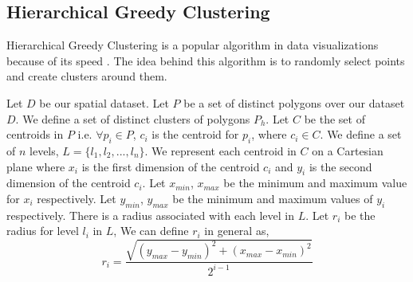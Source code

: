


\subsection{Hierarchical Greedy Clustering}
Hierarchical Greedy Clustering is a popular algorithm in data visualizations because of its speed \citep{hgclustering}. The idea behind this algorithm is to randomly select points and create clusters around them.

Let $D$ be our spatial dataset. Let $P$ be a set of distinct polygons over our dataset $D$. We define a set of distinct clusters of polygons $P_h$. Let $C$ be the set of centroids in $P$ i.e. $\forall p_i \in P$, $c_i$ is the centroid for $p_i$, where $c_i \in C$. We define a set of $n$ levels, $L = \{l_1, l_2,...,l_n\}$. We represent each centroid in $C$ on a Cartesian plane where $x_i$ is the first dimension of the centroid $c_i$ and $y_i$ is the second dimension of the centroid $c_i$. Let $x_{min}$, $x_{max}$ be the minimum and maximum value for $x_i$ respectively. Let $y_{min}$, $y_{max}$ be the minimum and maximum values of $y_i$ respectively. There is a radius associated with each level in $L$. Let $r_i$ be the radius for level $l_i$ in $L$, We can define $r_i$ in general as,
$$r_i = \frac{\sqrt{(y_{max}-y_{min})^2+(x_{max}-x_{min})^2}}{2^{i-1}}$$

